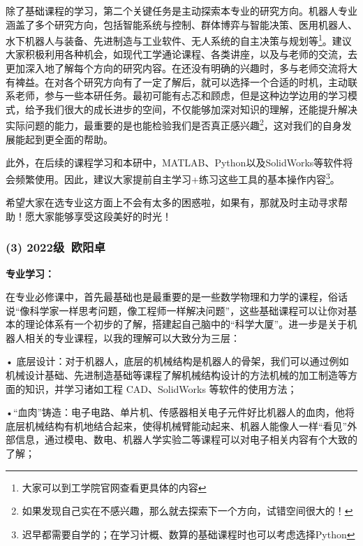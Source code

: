 \documentclass[11pt,oneside]{book}
\begin{document}
\vspace{10pt}

除了基础课程的学习，第二个关键任务是主动探索本专业的研究方向。机器人专业涵盖了多个研究方向，包括智能系统与控制、群体博弈与智能决策、医用机器人、水下机器人与装备、先进制造与工业软件、无人系统的自主决策与规划等\footnote{大家可以到工学院官网查看更具体的内容}。建议大家积极利用各种机会，如现代工学通论课程、各类讲座，以及与老师的交流，去更加深入地了解每个方向的研究内容。在还没有明确的兴趣时，多与老师交流将大有裨益。在对各个研究方向有了一定了解后，就可以选择一个合适的时机，主动联系老师，参与一些本研任务。最初可能有忐忑和顾虑，但是这种边学边用的学习模式，给予我们很大的成长进步的空间，不仅能够加深对知识的理解，还能提升解决实际问题的能力，最重要的是也能检验我们是否真正感兴趣\footnote{如果发现自己实在不感兴趣，那么就去探索下一个方向，试错空间很大的！}，这对我们的自身发展能起到更全面的帮助。

\vspace{10pt}

此外，在后续的课程学习和本研中，MATLAB、Python以及SolidWorks等软件将会频繁使用。因此，建议大家提前自主学习+练习这些工具的基本操作内容\footnote{迟早都需要自学的；在学习计概、数算的基础课程时也可以考虑选择Python}。

\vspace{10pt}

希望大家在选专业这方面上不会有太多的困惑啦，如果有，那就及时主动寻求帮助！愿大家能够享受这段美好的时光！

\subsubsection{ (3) 2022级\ 欧阳卓}
\textbf{专业学习：}

在专业必修课中，首先最基础也是最重要的是一些数学物理和力学的课程，俗话说“像科学家一样思考问题，像工程师一样解决问题”，这些基础课程可以让你对基本的理论体系有一个初步的了解，搭建起自己脑中的“科学大厦”。进一步是关于机器人相关的专业课程，以我的理解可以大致分为三层：

\vspace{10pt}

• 底层设计：对于机器人，底层的机械结构是机器人的骨架，我们可以通过例如机械设计基础、先进制造基础等课程了解机械结构设计的方法机械的加工制造等方面的知识，并学习诸如工程 CAD、SolidWorks 等软件的使用方法；

\vspace{10pt}

•“血肉”铸造：电子电路、单片机、传感器相关电子元件好比机器人的血肉，他将底层机械结构有机地结合起来，使得机械臂能动起来、机器人能像人一样“看见”外部信息，通过模电、数电、机器人学实验二等课程可以对电子相关内容有个大致的了解；
\end{document}
